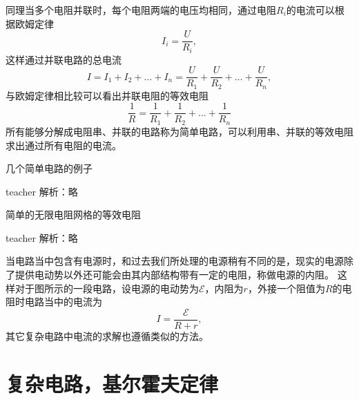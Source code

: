 同理当多个电阻并联时，每个电阻两端的电压均相同，通过电阻$R_i$的电流可以根据欧姆定律
\begin{equation}
I_i = \frac{U}{R_i},
\end{equation}
这样通过并联电路的总电流
\[
I=I_1+I_2+\dots +I_n = \frac{U}{R_1}+\frac{U}{R_2}+\dots +\frac{U}{R_n},
\]
与欧姆定律相比较可以看出并联电阻的等效电阻
\begin{equation}
\frac{1}{R}=\frac{1}{R_1}+\frac{1}{R_2}+\dots+\frac{1}{R_n}
\end{equation}
所有能够分解成电阻串、并联的电路称为简单电路，可以利用串、并联的等效电阻求出通过所有电阻的电流。

\begin{example}
几个简单电路的例子
\begin{taggedblock}{teacher}
\newline
解析：略
\end{taggedblock}
\end{example}

\begin{example}
简单的无限电阻网格的等效电阻
\begin{taggedblock}{teacher}
\newline
解析：略
\end{taggedblock}
\end{example}

当电路当中包含有电源时，和过去我们所处理的电源稍有不同的是，现实的电源除了提供电动势以外还可能会由其内部结构带有一定的电阻，称做电源的{\heiti 内阻}。
这样对于图所示的一段电路，设电源的电动势为$\mathcal{E}$，内阻为$r$，外接一个阻值为$R$的电阻时电路当中的电流为
\begin{equation}
I=\frac{\mathcal{E}}{R+r},
\end{equation}
其它复杂电路中电流的求解也遵循类似的方法。




\section{复杂电路，基尔霍夫定律}

